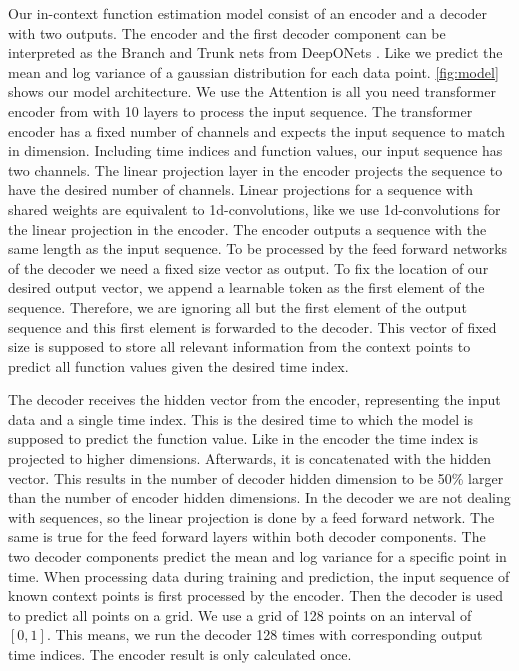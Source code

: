 \label{sec:model}
Our in-context function estimation model consist of an encoder and a decoder with two outputs. The encoder and the first decoder component can be interpreted as the Branch and Trunk nets from DeepONets \citet{Lu_2021}. Like \citet{seifner2025zeroshotimputationfoundationinference} we predict the mean and log variance of a gaussian distribution for each data point. \autoref{fig:model} shows our model architecture. We use the Attention is all you need transformer encoder from \citet{vaswani2017attention} with 10 layers to process the input sequence. The transformer encoder has a fixed number of channels and expects the input sequence to match in dimension. Including time indices and function values, our input sequence has two channels. The linear projection layer in the encoder projects the sequence to have the desired number of channels. Linear projections for a sequence with shared weights are equivalent to 1d-convolutions, like \citet{vaswani2017attention} we use 1d-convolutions for the linear projection in the encoder. The encoder outputs a sequence with the same length as the input sequence. To be processed by the feed forward networks of the decoder we need a fixed size vector as output. To fix the location of our desired output vector, we append a learnable token as the first element of the sequence. Therefore, we are ignoring all but the first element of the output sequence and this first element is forwarded to the decoder. This vector of fixed size is supposed to store all relevant information from the context points to predict all function values given the desired time index.

The decoder receives the hidden vector from the encoder, representing the input data and a single time index. This is the desired time to which the model is supposed to predict the function value. Like in the encoder the time index is projected to higher dimensions. Afterwards, it is concatenated with the hidden vector. This results in the number of decoder hidden dimension to be 50\% larger than the number of encoder hidden dimensions. In the decoder we are not dealing with sequences, so the linear projection is done by a feed forward network. The same is true for the feed forward layers within both decoder components. The two decoder components predict the mean and log variance for a specific point in time. When processing data during training and prediction, the input sequence of known context points is first processed by the encoder. Then the decoder is used to predict all points on a grid. We use a grid of 128 points on an interval of $[0,1]$. This means, we run the decoder 128 times with corresponding output time indices. The encoder result is only calculated once. 

